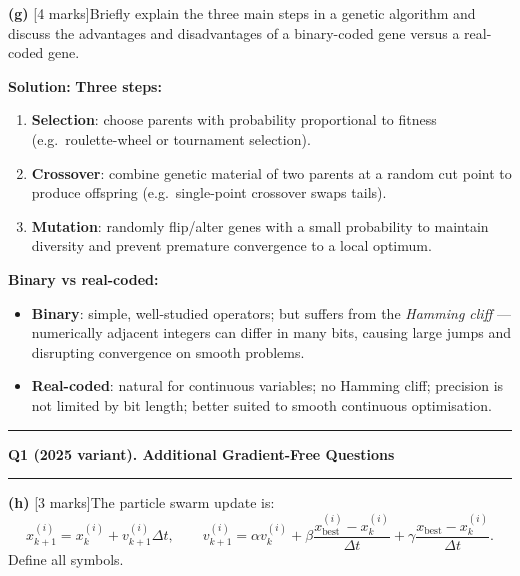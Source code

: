 \documentclass[10pt,a4paper]{article}
\newcommand{\sectitle}[1]{%
  \vspace{8pt}\noindent\rule{\linewidth}{0.8pt}\par\vspace{2pt}%
  {\large\textbf{#1}}\par\vspace{2pt}\rule{\linewidth}{0.4pt}\vspace{4pt}}
\newcommand{\Sol}{\par\vspace{4pt}\noindent\textbf{Solution:}\enspace}
\begin{document}
\vspace{4pt}
\noindent\textbf{(g)} [4 marks]\quad Briefly explain the three main steps in a
genetic algorithm and discuss the advantages and disadvantages of a binary-coded
gene versus a real-coded gene.

\Sol
\textbf{Three steps:}
\begin{enumerate}[noitemsep, topsep=2pt]
  \item \textbf{Selection}: choose parents with probability proportional to
        fitness (e.g.\ roulette-wheel or tournament selection).
  \item \textbf{Crossover}: combine genetic material of two parents at a random
        cut point to produce offspring (e.g.\ single-point crossover swaps tails).
  \item \textbf{Mutation}: randomly flip/alter genes with a small probability to
        maintain diversity and prevent premature convergence to a local optimum.
\end{enumerate}

\textbf{Binary vs real-coded:}
\begin{itemize}[noitemsep, topsep=2pt]
  \item \textbf{Binary}: simple, well-studied operators; but suffers from the
        \emph{Hamming cliff} --- numerically adjacent integers can differ in many
        bits, causing large jumps and disrupting convergence on smooth problems.
  \item \textbf{Real-coded}: natural for continuous variables; no Hamming cliff;
        precision is not limited by bit length; better suited to smooth continuous
        optimisation.
\end{itemize}

\sectitle{Q1 (2025 variant). Additional Gradient-Free Questions}

\noindent\textbf{(h)} [3 marks]\quad The particle swarm update is:
\[
  x^{(i)}_{k+1} = x^{(i)}_k + v^{(i)}_{k+1}\Delta t, \qquad
  v^{(i)}_{k+1} = \alpha v^{(i)}_k
    + \beta\frac{x^{(i)}_{\mathrm{best}}-x^{(i)}_k}{\Delta t}
    + \gamma\frac{x_{\mathrm{best}}-x^{(i)}_k}{\Delta t}.
\]
Define all symbols.
\end{document}
